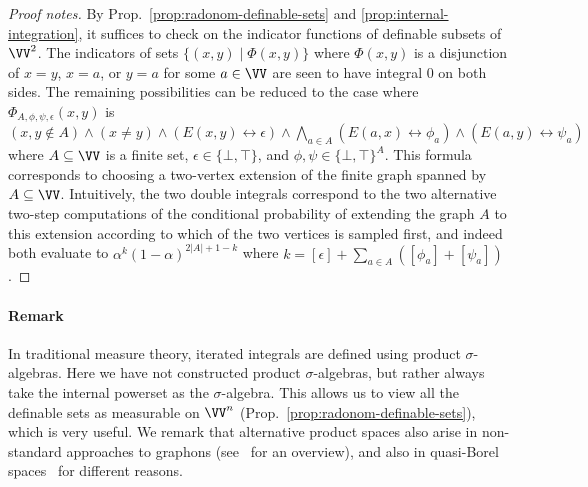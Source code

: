 \begin{proof}[Proof notes]
  By Prop.~\ref{prop:radonom-definable-sets} and \ref{prop:internal-integration}, it suffices to check on the indicator functions of definable subsets of $\VV^2$.
  The indicators of sets $\{(x,y) \mid \Phi(x,y)\}$ where $\Phi(x,y)$ is a disjunction of $x = y$, $x = a$, or $y = a$ for some $a \in \VV$ are seen to have integral $0$ on both sides.
  The remaining possibilities can be reduced to 
  the case where $\Phi_{A,\phi,\psi,\epsilon}(x,y)$ is $(x,y \notin A) \wedge (x \neq y) \wedge (E(x,y) \leftrightarrow \epsilon) \wedge \bigwedge_{a \in A} (E(a,x) \leftrightarrow \phi_a) \wedge (E(a,y) \leftrightarrow \psi_a)$
  where $A \subseteq \VV$ is a finite set, $\epsilon \in \{\bot,\top\}$, and $\phi,\psi \in \{\bot,\top\}^A$.
  This formula corresponds to choosing a two-vertex extension of the finite graph spanned by $A \subseteq \VV$.
  Intuitively, the two double integrals correspond to the two alternative two-step computations of the conditional probability of extending the graph $A$ to this extension according to which of the two vertices is sampled first, and indeed both evaluate to $α^k (1-α)^{2|A|+1 - k}$ where $k = [\epsilon] + \sum_{a \in A} ([\phi_a] + [\psi_a])$.
\end{proof}

\paragraph*{Remark} In traditional measure theory, iterated integrals are defined using product $\sigma$-algebras. Here we have not constructed product $\sigma$-algebras, but rather always take the internal powerset as the $\sigma$-algebra. This allows us to view all the definable sets as measurable on $\VV^n$ (Prop.~\ref{prop:radonom-definable-sets}), which is very useful. We remark that alternative product spaces also arise in non-standard approaches to graphons (see~\cite[\S6]{tao-graphons} for an overview), and also in quasi-Borel spaces~\cite{qbs} for different reasons.

